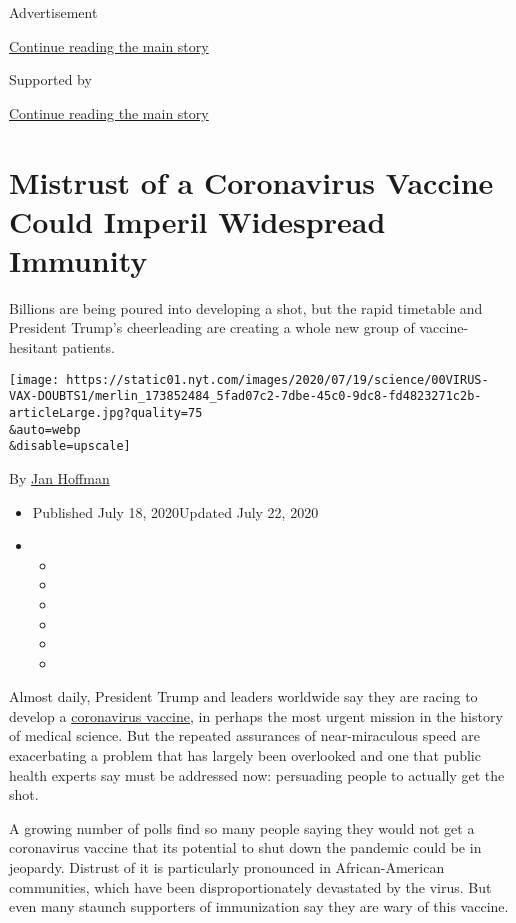 Advertisement

\protect\hyperlink{after-top}{Continue reading the main story}

Supported by

\protect\hyperlink{after-sponsor}{Continue reading the main story}

\hypertarget{mistrust-of-a-coronavirus-vaccine-could-imperil-widespread-immunity}{%
\section{Mistrust of a Coronavirus Vaccine Could Imperil Widespread
Immunity}\label{mistrust-of-a-coronavirus-vaccine-could-imperil-widespread-immunity}}

Billions are being poured into developing a shot, but the rapid
timetable and President Trump's cheerleading are creating a whole new
group of vaccine-hesitant patients.

\texttt{[image: https://static01.nyt.com/images/2020/07/19/science/00VIRUS-VAX-DOUBTS1/merlin\_173852484\_5fad07c2-7dbe-45c0-9dc8-fd4823271c2b-articleLarge.jpg?quality=75\\\&auto=webp\\\&disable=upscale]}

By \href{https://www.nytimes.com/by/jan-hoffman}{Jan Hoffman}

\begin{itemize}
\item
  Published July 18, 2020Updated July 22, 2020
\item
  \begin{itemize}
  \item
  \item
  \item
  \item
  \item
  \item
  \end{itemize}
\end{itemize}

Almost daily, President Trump and leaders worldwide say they are racing
to develop a
\href{https://www.nytimes.com/2020/07/22/upshot/vaccine-coronavirus-government-purchase.html}{coronavirus
vaccine}, in perhaps the most urgent mission in the history of medical
science. But the repeated assurances of near-miraculous speed are
exacerbating a problem that has largely been overlooked and one that
public health experts say must be addressed now: persuading people to
actually get the shot.

A growing number of polls find so many people saying they would not get
a coronavirus vaccine that its potential to shut down the pandemic could
be in jeopardy. Distrust of it is particularly pronounced in
African-American communities, which have been disproportionately
devastated by the virus. But even many staunch supporters of
immunization say they are wary of this vaccine.

